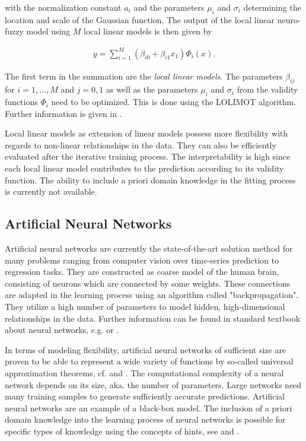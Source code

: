 with the normalization constant $a_i$ and the parameters $\mu_i$ and $\sigma_i$ determining the location and scale of the Gaussian function. The output of the local linear neuro-fuzzy model using $M$ local linear models is then given by

\begin{align} \label{eq:LOLIMOT}
	y = \sum_{i=1}^M (\beta_{i0} + \beta_{i1} x_1) \Phi_i(x).
\end{align}

The first term in the summation are the \emph{local linear models}. The parameters $\beta_{ij}$ for $i=1, \dots, M$ and $j=0, 1$ as well as the parameters $\mu_i$ and $\sigma_i$ from the validity functions $\Phi_i$ need to be optimized. This is done using the LOLIMOT algorithm. Further information is given in \cite{nelles2013nonlinear}. 

Local linear models as extension of linear models possess more flexibility with regards to non-linear relationships in the data. They can also be efficiently evaluated after the iterative training process. The interpretability is high since each local linear model contributes to the prediction according to its validity function. The ability to include a priori domain knowledge in the fitting process is currently not available.   

\subsection{Artificial Neural Networks}

Artificial neural networks are currently the state-of-the-art solution method for many problems ranging from computer vision over time-series prediction to regression tasks. They are constructed as coarse model of the human brain, consisting of neurons which are connected by some weights. These connections are adapted in the learning process using an algorithm called "backpropagation". They utilize a high number of parameters to model hidden, high-dimensional relationships in the data. Further information can be found in standard textbook about neural networks, e.g. \cite{bishop2006patternRecognition} or \cite{goodfellow2016deep}. 

In terms of modeling flexibility, artificial neural networks of sufficient size are proven to be able to represent a wide variety of functions by so-called universal approximation theorems, cf. \cite{cybenko1989approximation} and \cite{hornik1991approximation}. The computational complexity of a neural network depends on its size, aka. the number of parameters. Large networks need many training samples to generate sufficiently accurate predictions. Artificial neural networks are an example of a black-box model. The inclusion of a priori domain knowledge into the learning process of neural networks is possible for specific types of knowledge using the concepts of hints, see \cite{abu1990learning} and \cite{sill1997monotonicity}.


